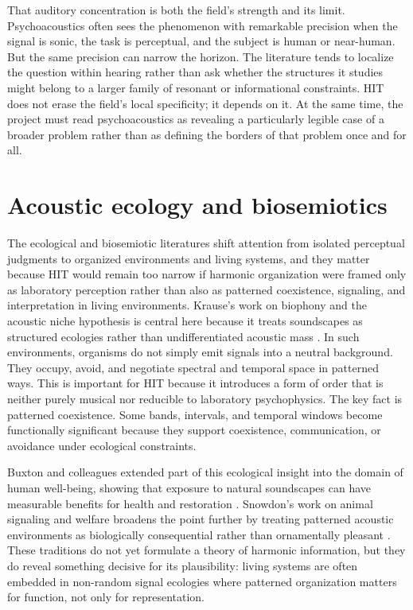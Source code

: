 That auditory concentration is both the field's strength and its limit. Psychoacoustics often sees the phenomenon with remarkable precision when the signal is sonic, the task is perceptual, and the subject is human or near-human. But the same precision can narrow the horizon. The literature tends to localize the question within hearing rather than ask whether the structures it studies might belong to a larger family of resonant or informational constraints. HIT does not erase the field's local specificity; it depends on it. At the same time, the project must read psychoacoustics as revealing a particularly legible case of a broader problem rather than as defining the borders of that problem once and for all.

\section{Acoustic ecology and biosemiotics}

The ecological and biosemiotic literatures shift attention from isolated perceptual judgments to organized environments and living systems, and they matter because HIT would remain too narrow if harmonic organization were framed only as laboratory perception rather than also as patterned coexistence, signaling, and interpretation in living environments. Krause's work on biophony and the acoustic niche hypothesis is central here because it treats soundscapes as structured ecologies rather than undifferentiated acoustic mass \parencite{krause_2013}. In such environments, organisms do not simply emit signals into a neutral background. They occupy, avoid, and negotiate spectral and temporal space in patterned ways. This is important for HIT because it introduces a form of order that is neither purely musical nor reducible to laboratory psychophysics. The key fact is patterned coexistence. Some bands, intervals, and temporal windows become functionally significant because they support coexistence, communication, or avoidance under ecological constraints.

Buxton and colleagues extended part of this ecological insight into the domain of human well-being, showing that exposure to natural soundscapes can have measurable benefits for health and restoration \parencite{buxton_2021}. Snowdon's work on animal signaling and welfare broadens the point further by treating patterned acoustic environments as biologically consequential rather than ornamentally pleasant \parencite{snowdon_2021}. These traditions do not yet formulate a theory of harmonic information, but they do reveal something decisive for its plausibility: living systems are often embedded in non-random signal ecologies where patterned organization matters for function, not only for representation.

